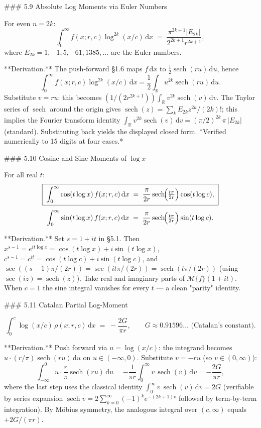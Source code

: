 ### 5.9 Absolute Log Moments via Euler Numbers

For even $n=2k$:
$$
\int_{0}^{\infty}f(x;r,c)\log^{2k}(x/c)\,\mathrm dx \;=\; \frac{\pi^{2k+1}|E_{2k}|}{2^{2k+1}r^{2k+1}},
$$
where $E_{2k} = 1,-1,5,-61,1385,\dots$ are the Euler numbers.

**Derivation.** The push‑forward §1.6 maps $f\,\mathrm dx$ to $\tfrac{1}{2}\operatorname{sech}(ru)\,\mathrm du$, hence
$$
\int_{0}^{\infty}f(x;r,c)\log^{2k}(x/c)\,\mathrm dx = \frac{1}{2}\int_{\mathbb R}u^{2k}\operatorname{sech}(ru)\,\mathrm du.
$$
Substitute $v = ru$: this becomes $(1/(2r^{2k+1}))\int_{\mathbb R}v^{2k}\operatorname{sech}(v)\,\mathrm dv$. The Taylor series of $\operatorname{sech}$ around the origin gives $\operatorname{sech}(z) = \sum_{k}E_{2k}z^{2k}/(2k)!$; this implies the Fourier transform identity $\int_{\mathbb R}v^{2k}\operatorname{sech}(v)\,\mathrm dv = (\pi/2)^{2k}\,\pi\,|E_{2k}|$ (standard). Substituting back yields the displayed closed form. *Verified numerically to 15 digits at four cases.*

### 5.10 Cosine and Sine Moments of $\log x$

For all real $t$:
$$
\boxed{\;\int_{0}^{\infty}\cos(t\log x)\,f(x;r,c)\,\mathrm dx \;=\; \frac{\pi}{2r}\operatorname{sech}\!\Bigl(\tfrac{t\pi}{2r}\Bigr)\cos(t\log c),\;}
$$
$$
\int_{0}^{\infty}\sin(t\log x)\,f(x;r,c)\,\mathrm dx \;=\; \frac{\pi}{2r}\operatorname{sech}\!\Bigl(\tfrac{t\pi}{2r}\Bigr)\sin(t\log c).
$$

**Derivation.** Set $s = 1+it$ in §5.1. Then $x^{s-1} = e^{it\log x} = \cos(t\log x) + i\sin(t\log x)$, $c^{s-1} = c^{it} = \cos(t\log c) + i\sin(t\log c)$, and $\sec((s-1)\pi/(2r)) = \sec(it\pi/(2r)) = \operatorname{sech}(t\pi/(2r))$ (using $\sec(iz)=\operatorname{sech}(z)$). Take real and imaginary parts of $\mathcal M\{f\}(1+it)$. When $c=1$ the sine integral vanishes for every $t$ — a clean "parity" identity.

### 5.11 Catalan Partial Log‑Moment

$$
\int_{0}^{c}\log(x/c)\,\rho(x;r,c)\,\mathrm dx \;=\; -\frac{2G}{\pi r},\qquad G \approx 0.91596\ldots\text{ (Catalan's constant).}
$$

**Derivation.** Push forward via $u=\log(x/c)$: the integrand becomes $u\cdot(r/\pi)\operatorname{sech}(ru)\,\mathrm du$ on $u\in(-\infty,0)$. Substitute $v = -ru$ (so $v\in(0,\infty)$):
$$
\int_{-\infty}^{0}u\cdot\frac{r}{\pi}\operatorname{sech}(ru)\,\mathrm du = -\frac{1}{\pi r}\int_{0}^{\infty}v\,\operatorname{sech}(v)\,\mathrm dv = -\frac{2G}{\pi r},
$$
where the last step uses the classical identity $\int_{0}^{\infty}v\,\operatorname{sech}(v)\,\mathrm dv = 2G$ (verifiable by series expansion $\operatorname{sech} v = 2\sum_{k=0}^{\infty}(-1)^{k}e^{-(2k+1)v}$ followed by term-by-term integration). By Möbius symmetry, the analogous integral over $(c,\infty)$ equals $+2G/(\pi r)$.

